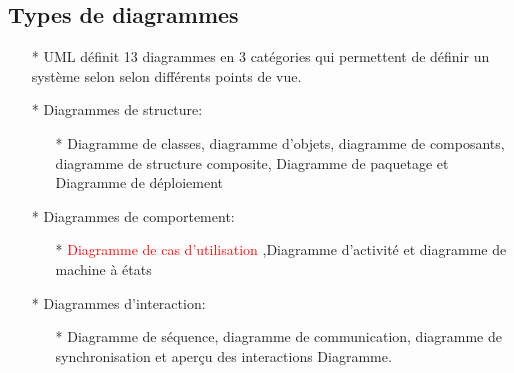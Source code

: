 \documentclass[12pt]{article}
\begin{document}
\subsection{Types de diagrammes}
\begin{itemize}
	\item [*] UML définit 13 diagrammes en 3 catégories qui permettent de définir un système selon
	selon différents points de vue.
	\item [*] Diagrammes de structure:
	\begin{itemize}
		\item[*] Diagramme de classes, diagramme d'objets, diagramme de composants, diagramme de structure composite,
		Diagramme de paquetage et Diagramme de déploiement
	\end{itemize}
\item [*] Diagrammes de comportement:
\begin{itemize}
	\item[*] \textcolor{red}{Diagramme de cas d'utilisation} ,Diagramme d'activité et diagramme de machine à états
\end{itemize}
\item [*] Diagrammes d'interaction:
\begin{itemize}
	\item [*] Diagramme de séquence, diagramme de communication, diagramme de synchronisation et aperçu des interactions
	Diagramme.
\end{itemize}
\end{itemize}
\end{document}
